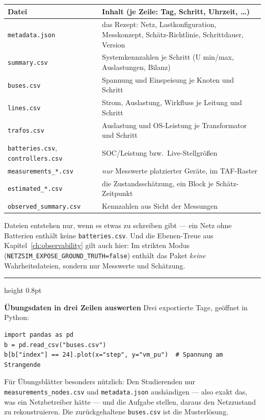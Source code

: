 \documentclass[11pt,a4paper,parskip=half]{scrreprt}
\newenvironment{beispiel}[1][Beispiel]
  {\par\medskip
   {\color{bsp}\hrule height 0.8pt}\nopagebreak\smallskip
   \noindent\textbf{\textsf{\textcolor{bsp}{#1}}}\quad\ignorespaces}
  {\par\nopagebreak\smallskip{\color{bsp}\hrule height 0.8pt}\par\medskip}
\begin{document}
\begin{center}
\small
\begin{tabularx}{\textwidth}{@{}lX@{}}
\toprule
Datei & Inhalt (je Zeile: Tag, Schritt, Uhrzeit, \ldots) \\
\midrule
\texttt{metadata.json} & das Rezept: Netz, Lastkonfiguration, Messkonzept, Schätz-Richtlinie, Schrittdauer, Version \\
\texttt{summary.csv} & Systemkennzahlen je Schritt (U min/max, Auslastungen, Bilanz) \\
\texttt{buses.csv} & Spannung und Einspeisung je Knoten und Schritt \\
\texttt{lines.csv} & Strom, Auslastung, Wirkfluss je Leitung und Schritt \\
\texttt{trafos.csv} & Auslastung und OS-Leistung je Transformator und Schritt \\
\texttt{batteries.csv}, \texttt{controllers.csv} & SOC/Leistung bzw.\ Live-Stellgrößen \\
\texttt{measurements\_*.csv} & \emph{nur} Messwerte platzierter Geräte, im TAF-Raster \\
\texttt{estimated\_*.csv} & die Zustandsschätzung, ein Block je Schätz-Zeitpunkt \\
\texttt{observed\_summary.csv} & Kennzahlen aus Sicht der Messungen \\
\bottomrule
\end{tabularx}
\end{center}

Dateien entstehen nur, wenn es etwas zu schreiben gibt --- ein Netz
ohne Batterien enthält keine \texttt{batteries.csv}. Und die
Ebenen-Treue aus Kapitel~\ref{ch:observability} gilt auch hier: Im
strikten Modus (\texttt{NETZSIM\_EXPOSE\_GROUND\_TRUTH=false})
enthält das Paket \emph{keine} Wahrheitsdateien, sondern nur
Messwerte und Schätzung.

\begin{beispiel}[Übungsdaten in drei Zeilen auswerten]
Drei exportierte Tage, geöffnet in Python:
\begin{lstlisting}
import pandas as pd
b = pd.read_csv("buses.csv")
b[b["index"] == 24].plot(x="step", y="vm_pu")  # Spannung am Strangende
\end{lstlisting}
Für Übungsblätter besonders nützlich: Den Studierenden nur
\texttt{measurements\_nodes.csv} und \texttt{metadata.json}
aushändigen --- also exakt das, was ein Netzbetreiber hätte --- und
die Aufgabe stellen, daraus den Netzzustand zu rekonstruieren. Die
zurückgehaltene \texttt{buses.csv} ist die Musterlösung.
\end{beispiel}
\end{document}
